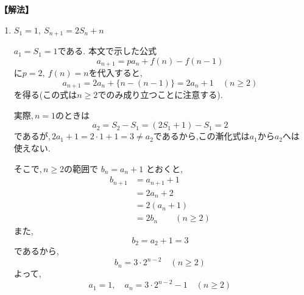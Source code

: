     \noindent\textbf{【解法】}
    \begin{enumerate}[label=(\arabic*),parsep=3pt]
    \item $\displaystyle S_1=1,\ S_{n+1}=2S_n+n$

        $a_1=S_1=1$である.
        本文で示した公式
        \[
          a_{n+1}=pa_{n}+f(n)-f(n-1)
        \]
        に$p=2,\ f(n)=n$を代入すると,
        \[
          a_{n+1}=2a_n+\{n-(n-1)\}=2a_n+1\quad(n\ge2)
        \]
        を得る(この式は$n\ge2$でのみ成り立つことに注意する).

        実際,\,$n=1$のときは
        \[
          a_2=S_2-S_1=(2S_1+1)-S_1=2
        \]
        であるが,\,$2a_1+1=2\cdot1+1=3\ne a_2$であるから,この漸化式は$a_1$から$a_2$へは使えない.

        そこで,\,$n\ge2$の範囲で $b_n=a_n+1$ とおくと,
        \begin{align*}
          b_{n+1}
            &=a_{n+1}+1\\
            &=2a_n+2\\
            &=2(a_n+1)\\
            &=2b_n\qquad(n\ge2)
        \end{align*}
        また,
        \[
          b_2=a_2+1=3
        \]
        であるから,
        \[
          b_n=3\cdot2^{n-2}\quad(n\ge2)
        \]
        よって,
        \[
          a_1=1,\quad a_n=3\cdot2^{n-2}-1\quad(n\ge2)
        \]
    \end{enumerate}


